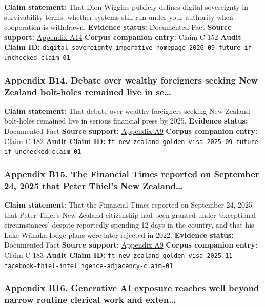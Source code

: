 \documentclass[
  american,
  11pt,
  letterpaper,
]{article}
\begin{document}
\textbf{Claim statement:} That Dion Wiggins publicly defines digital
sovereignty in survivability terms: whether systems still run under your
authority when cooperation is withdrawn. \textbf{Evidence status:}
Documented Fact \textbf{Source support:}
\hyperref[ch-09-appendix-a14-the-digital-sovereignty-imperative]{Appendix
A14} \textbf{Corpus companion entry:} Claim C-152 \textbf{Audit Claim
ID:}
\texttt{digital-sovereignty-imperative-homepage-2026-09-future-if-unchecked-claim-01}

\subsubsection{Appendix B14. Debate over wealthy foreigners seeking New
Zealand bolt-holes remained live in
se\ldots{}}\label{ch-09-appendix-b14-debate-over-wealthy-foreigners-seeking-new-zealand-bolt-holes-remained-live-in-se}

\textbf{Claim statement:} That debate over wealthy foreigners seeking
New Zealand bolt-holes remained live in serious financial press by 2025.
\textbf{Evidence status:} Documented Fact \textbf{Source support:}
\hyperref[ch-09-appendix-a9-new-zealand-woos-the-wealthy-with-golden-visa-changes]{Appendix
A9} \textbf{Corpus companion entry:} Claim C-182 \textbf{Audit Claim
ID:}
\texttt{ft-new-zealand-golden-visa-2025-09-future-if-unchecked-claim-01}

\subsubsection{Appendix B15. The Financial Times reported on September
24, 2025 that Peter Thiel's New
Zealand\ldots{}}\label{ch-09-appendix-b15-the-financial-times-reported-on-september-24-2025-that-peter-thiel-s-new-zealand}

\textbf{Claim statement:} That the Financial Times reported on September
24, 2025 that Peter Thiel's New Zealand citizenship had been granted
under `exceptional circumstances' despite reportedly spending 12 days in
the country, and that his Lake Wānaka lodge plans were later rejected in
2022. \textbf{Evidence status:} Documented Fact \textbf{Source support:}
\hyperref[ch-09-appendix-a9-new-zealand-woos-the-wealthy-with-golden-visa-changes]{Appendix
A9} \textbf{Corpus companion entry:} Claim C-183 \textbf{Audit Claim
ID:}
\texttt{ft-new-zealand-golden-visa-2025-11-facebook-thiel-intelligence-adjacency-claim-01}

\subsubsection{Appendix B16. Generative AI exposure reaches well beyond
narrow routine clerical work and
exten\ldots{}}\label{ch-09-appendix-b16-generative-ai-exposure-reaches-well-beyond-narrow-routine-clerical-work-and-exten}
\end{document}
